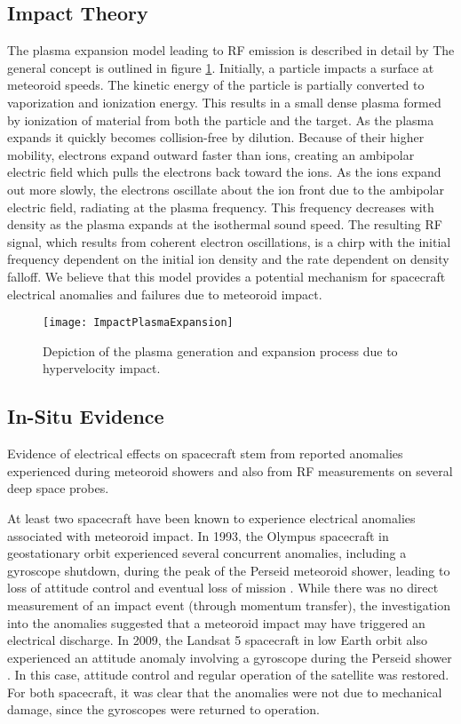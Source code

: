 \subsection{Impact Theory}
The plasma expansion model leading to RF emission is described in detail by \citet{Close2010}  The general concept is outlined in figure \ref{fig.ImpactPlasmaExpansion}.  Initially, a particle impacts a surface at meteoroid speeds.  The kinetic energy of the particle is partially converted to vaporization and ionization energy.  This results in a small dense plasma formed by ionization of material from both the particle and the target.  As the plasma expands it quickly becomes collision-free by dilution.  Because of their higher mobility, electrons expand outward faster than ions, creating an ambipolar electric field which pulls the electrons back toward the ions.  As the ions expand out more slowly, the electrons oscillate about the ion front due to the ambipolar electric field, radiating at the plasma frequency.  This frequency decreases with density as the plasma expands at the isothermal sound speed.  The resulting RF signal, which results from coherent electron oscillations, is a chirp with the initial frequency dependent on the initial ion density and the rate dependent on density falloff.  We believe that this model provides a potential mechanism for spacecraft electrical anomalies and failures due to meteoroid impact.

\begin{figure}[\floatplace]
\begin{center}
\texttt{[image: ImpactPlasmaExpansion]}
\end{center}
\caption{\label{fig.ImpactPlasmaExpansion} Depiction of the plasma generation and expansion process due to hypervelocity impact.}
\end{figure}

\subsection{In-Situ Evidence}
Evidence of electrical effects on spacecraft stem from reported anomalies experienced during meteoroid showers and also from RF measurements on several deep space probes.

At least two spacecraft have been known to experience electrical anomalies associated with meteoroid impact.  In 1993, the Olympus spacecraft in geostationary orbit experienced several concurrent anomalies, including a gyroscope shutdown, during the peak of the Perseid meteoroid shower, leading to loss of attitude control and eventual loss of mission \cite{Caswell1995}.  While there was no direct measurement of an impact event (through momentum transfer), the investigation into the anomalies suggested that a meteoroid impact may have triggered an electrical discharge.  In 2009, the Landsat 5 spacecraft in low Earth orbit also experienced an attitude anomaly involving a gyroscope during the Perseid shower \cite{USGS2009}.  In this case, attitude control and regular operation of the satellite was restored.  For both spacecraft, it was clear that the anomalies were not due to mechanical damage, since the gyroscopes were returned to operation.

